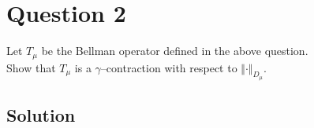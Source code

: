\section*{Question 2}

Let \( T_{\mu} \) be the Bellman operator defined in the above question. \\
Show that \( T_{\mu} \) is a \( \gamma \)--contraction with respect to \( {\Vert \cdot \Vert}_{D_{\mu}} \).

\subsection*{Solution}
